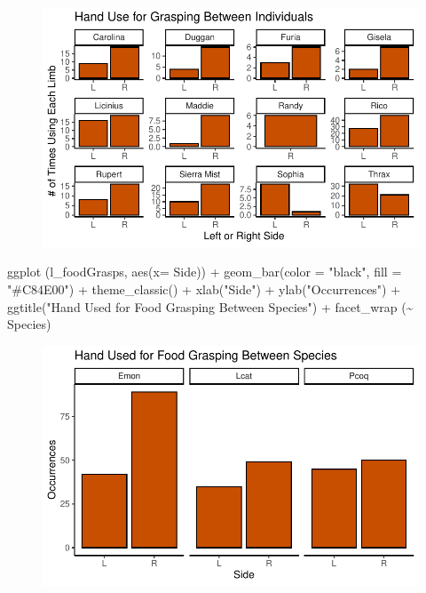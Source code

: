 \documentclass[
  letterpaper,
  DIV=11,
  numbers=noendperiod]{scrartcl}
\newenvironment{Shaded}{\begin{snugshade}}{\end{snugshade}}
\newcommand{\AttributeTok}[1]{\textcolor[rgb]{0.40,0.45,0.13}{#1}}
\newcommand{\FunctionTok}[1]{\textcolor[rgb]{0.28,0.35,0.67}{#1}}
\newcommand{\NormalTok}[1]{\textcolor[rgb]{0.00,0.23,0.31}{#1}}
\newcommand{\SpecialCharTok}[1]{\textcolor[rgb]{0.37,0.37,0.37}{#1}}
\newcommand{\StringTok}[1]{\textcolor[rgb]{0.13,0.47,0.30}{#1}}
\begin{document}
\begin{figure}[H]

{\centering \includegraphics{LeftyLemurs_files/figure-pdf/unnamed-chunk-36-1.pdf}

}

\end{figure}

\begin{Shaded}
\begin{Highlighting}[]
\FunctionTok{ggplot}\NormalTok{ (l\_foodGrasps, }\FunctionTok{aes}\NormalTok{(}\AttributeTok{x=}\NormalTok{ Side)) }\SpecialCharTok{+}
  \FunctionTok{geom\_bar}\NormalTok{(}\AttributeTok{color =} \StringTok{"black"}\NormalTok{, }\AttributeTok{fill =} \StringTok{"\#C84E00"}\NormalTok{) }\SpecialCharTok{+}
  \FunctionTok{theme\_classic}\NormalTok{() }\SpecialCharTok{+}
  \FunctionTok{xlab}\NormalTok{(}\StringTok{"Side"}\NormalTok{) }\SpecialCharTok{+}
  \FunctionTok{ylab}\NormalTok{(}\StringTok{"Occurrences"}\NormalTok{) }\SpecialCharTok{+}
  \FunctionTok{ggtitle}\NormalTok{(}\StringTok{"Hand Used for Food Grasping Between Species"}\NormalTok{) }\SpecialCharTok{+}
  \FunctionTok{facet\_wrap}\NormalTok{ (}\SpecialCharTok{\textasciitilde{}}\NormalTok{ Species)}
\end{Highlighting}
\end{Shaded}

\begin{figure}[H]

{\centering \includegraphics{LeftyLemurs_files/figure-pdf/unnamed-chunk-37-1.pdf}

}

\end{figure}
\end{document}
